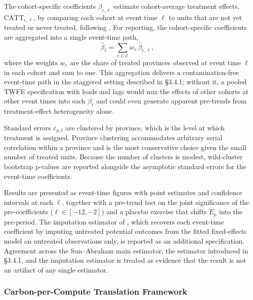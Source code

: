 \documentclass[12pt,a4paper]{article}
\begin{document}
The cohort-specific coefficients $\beta_{e,\ell}$ estimate cohort-average
treatment effects, $\text{CATT}_{e,\ell}$, by comparing each cohort at
event time $\ell$ to units that are not yet treated or never treated,
following \citet{sunabraham-2021-estimatingdynamictreatmenta}. For
reporting, the cohort-specific coefficients are aggregated into a
single event-time path,
\[
\hat{\beta}_\ell
= \sum_{e \in \mathcal{E}} w_e \, \hat{\beta}_{e,\ell},
\]
where the weights $w_e$ are the share of treated provinces observed
at event time $\ell$ in each cohort and sum to one. This aggregation
delivers a contamination-free event-time path in the staggered
setting described in §3.4.1; without it, a pooled TWFE specification
with leads and lags would mix the effects of other cohorts at other
event times into each $\beta_\ell$ and could even generate apparent
pre-trends from treatment-effect heterogeneity alone.

Standard errors $\varepsilon_{p,t}$ are clustered by province, which
is the level at which treatment is assigned. Province clustering
accommodates arbitrary serial correlation within a province and is
the most conservative choice given the small number of treated units.
Because the number of clusters is modest, wild-cluster bootstrap
p-values are reported alongside the asymptotic standard errors for
the event-time coefficients.

Results are presented as event-time figures with point estimates and
confidence intervals at each $\ell$, together with a pre-trend test
on the joint significance of the pre-coefficients
($\ell \in [-12, -2]$) and a placebo exercise that shifts $E_p$ into
the pre-period. The imputation estimator of
\citet{borusyaketal-2024-revisitingeventstudydesigns}, which recovers
each event-time coefficient by imputing untreated potential outcomes
from the fitted fixed-effects model on untreated observations only,
is reported as an additional specification. Agreement across the
Sun--Abraham main estimator, the
\citet{callawaysantanna-2021-differenceindifferencesmultipletimea}
estimator introduced in §3.4.1, and the
\citet{borusyaketal-2024-revisitingeventstudydesigns} imputation
estimator is treated as evidence that the result is not an artifact
of any single estimator.

\subsubsection{Carbon-per-Compute Translation Framework}
%
\end{document}
